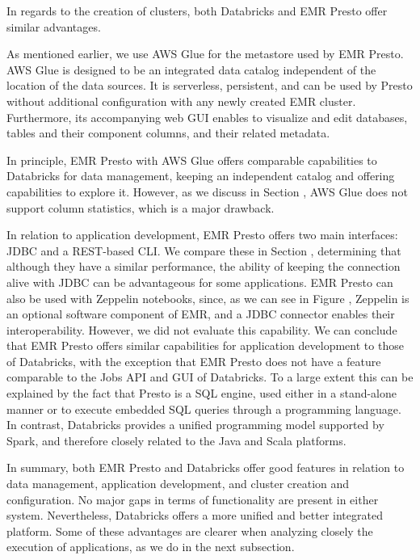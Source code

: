 In regards to the creation of clusters, both Databricks and EMR Presto offer similar advantages.

As mentioned earlier, we use AWS Glue for the metastore used by EMR Presto. AWS Glue is designed to be an integrated data catalog independent of the location of the data sources. It is serverless, persistent, and can be used by Presto without additional configuration with any newly created EMR cluster. Furthermore, its accompanying web GUI enables to visualize and edit databases, tables and their component columns, and their related metadata.

In principle, EMR Presto with AWS Glue offers comparable capabilities to Databricks for data management, keeping an independent catalog and offering capabilities to explore it. However, as we discuss in Section \label{referenceResultsDataLoading}, AWS Glue does not support column statistics, which is a major drawback.

In relation to application development, EMR Presto offers two main interfaces: JDBC and a REST-based CLI. We compare these in Section \label{prestoJDBvsCLI}, determining that although they have a similar performance, the ability of keeping the connection alive with JDBC can be advantageous for some applications. EMR Presto can also be used with Zeppelin notebooks, since, as we can see in Figure \label{fig:emrClusterCreationGUI}, Zeppelin is an optional software component of EMR, and a JDBC connector enables their interoperability. However, we did not evaluate this capability. We can conclude that EMR Presto offers similar capabilities for application development to those of Databricks, with the exception that EMR Presto does not have a feature comparable to the Jobs API and GUI of Databricks. To a large extent this can be explained by the fact that Presto is a SQL engine, used either in a stand-alone manner or to execute embedded SQL queries through a programming language. In contrast, Databricks provides a unified programming model supported by Spark, and therefore closely related to the Java and Scala platforms.

In summary, both EMR Presto and Databricks offer good features in relation to data management, application development, and cluster creation and configuration. No major gaps in terms of functionality are present in either system. Nevertheless, Databricks offers a more unified and better integrated platform. Some of these advantages are clearer when analyzing closely the execution of applications, as we do in the next subsection.

